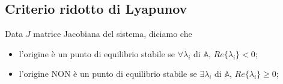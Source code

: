 \documentclass[a4paper]{article}
\begin{document}
	\subsection*{Criterio ridotto di Lyapunov}
	Data $J$ matrice Jacobiana del sistema, diciamo che \begin{itemize}
		\item l'origine è un punto di equilibrio stabile se $\forall\lambda_i$ di $\mathbb{A}$, $Re\lbrace\lambda_i\rbrace < 0$;
		\item l'origine NON è un punto di equilibrio stabile se $\exists\lambda_i$ di $\mathbb{A}$, $Re\lbrace\lambda_i\rbrace \geq 0$;
	\end{itemize}
\end{document}
